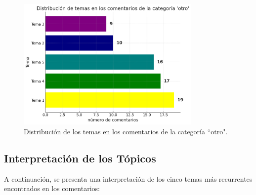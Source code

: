 \documentclass{matematicasud}
\begin{document}
\begin{figure}[H]
    \centering
    \includegraphics[width=0.8\textwidth]{imaged.png}
    \caption{Distribución de los temas en los comentarios de la categoría ``otro".}
    \label{fig:distribucion_temas}
\end{figure}


\subsection{Interpretación de los Tópicos}

A continuación, se presenta una interpretación de los cinco temas más recurrentes encontrados en los comentarios:
\end{document}
